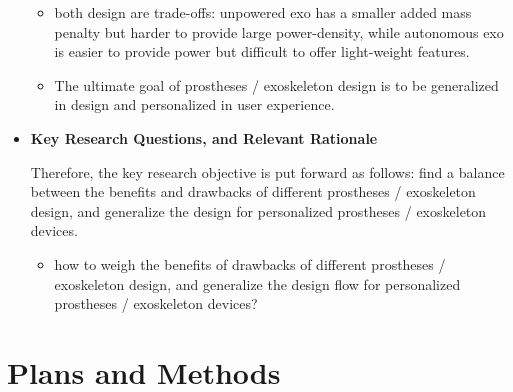 \documentclass{article}
\begin{document}
\begin{itemize}
    \begin{itemize}
        \item both design are trade-offs: unpowered exo has a smaller added mass penalty but harder to provide large power-density, while autonomous exo is easier to provide power but difficult to offer light-weight features. 
        \item The ultimate goal of prostheses / exoskeleton design is to be generalized in design and personalized in user experience. 
    \end{itemize}
    
    \item \textbf{Key Research Questions, and Relevant Rationale}
    
    Therefore, the key research objective is put forward as follows: find a balance between the benefits and drawbacks of different prostheses / exoskeleton design, and generalize the design for personalized prostheses / exoskeleton devices.

    \begin{itemize}
        \item how to weigh the benefits of drawbacks of different prostheses / exoskeleton design, and generalize the design flow for personalized prostheses / exoskeleton devices? 
    \end{itemize}
    

\end{itemize}

\section{Plans and Methods}
\end{document}
